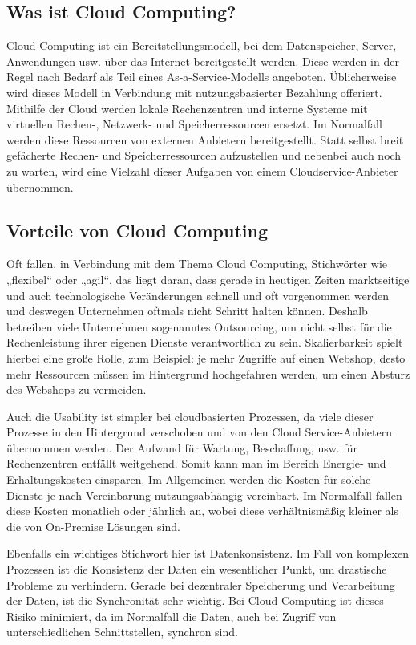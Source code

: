 \subsection{Was ist Cloud Computing?}

Cloud Computing ist ein Bereitstellungsmodell, bei dem Datenspeicher, Server, Anwendungen usw. über das Internet bereitgestellt werden. Diese werden in der Regel nach Bedarf als Teil eines As-a-Service-Modells angeboten. Üblicherweise wird dieses Modell in Verbindung mit nutzungsbasierter Bezahlung offeriert. Mithilfe der Cloud werden lokale Rechenzentren und interne Systeme mit virtuellen Rechen-, Netzwerk- und Speicherressourcen ersetzt. Im Normalfall werden diese Ressourcen von externen Anbietern bereitgestellt. Statt selbst breit gefächerte Rechen- und Speicherressourcen aufzustellen und nebenbei auch noch zu warten, wird eine Vielzahl dieser Aufgaben von einem Cloudservice-Anbieter übernommen.

\subsection{Vorteile von Cloud Computing}

Oft fallen, in Verbindung mit dem Thema Cloud Computing, Stichwörter wie „flexibel“ oder „agil“, das liegt daran, dass gerade in heutigen Zeiten marktseitige und auch technologische Veränderungen schnell und oft vorgenommen werden und deswegen Unternehmen oftmals nicht Schritt halten können. Deshalb betreiben viele Unternehmen sogenanntes Outsourcing, um nicht selbst für die Rechenleistung ihrer eigenen Dienste verantwortlich zu sein. Skalierbarkeit spielt hierbei eine große Rolle, zum Beispiel: je mehr Zugriffe auf einen Webshop, desto mehr Ressourcen müssen im Hintergrund hochgefahren werden, um einen Absturz des Webshops zu vermeiden.

Auch die Usability ist simpler bei cloudbasierten Prozessen, da viele dieser Prozesse in den Hintergrund verschoben und von den Cloud Service-Anbietern übernommen werden. Der Aufwand für Wartung, Beschaffung, usw. für Rechenzentren entfällt weitgehend. Somit kann man im Bereich Energie- und Erhaltungskosten einsparen. Im Allgemeinen werden die Kosten für solche Dienste je nach Vereinbarung nutzungsabhängig vereinbart. Im Normalfall fallen diese Kosten monatlich oder jährlich an, wobei diese verhältnismäßig kleiner als die von On-Premise Lösungen sind.

Ebenfalls ein wichtiges Stichwort hier ist Datenkonsistenz. Im Fall von komplexen Prozessen ist die Konsistenz der Daten ein wesentlicher Punkt, um drastische Probleme zu verhindern. Gerade bei dezentraler Speicherung und Verarbeitung der Daten, ist die Synchronität sehr wichtig. Bei Cloud Computing ist dieses Risiko minimiert, da im Normalfall die Daten, auch bei Zugriff von unterschiedlichen Schnittstellen, synchron sind.

